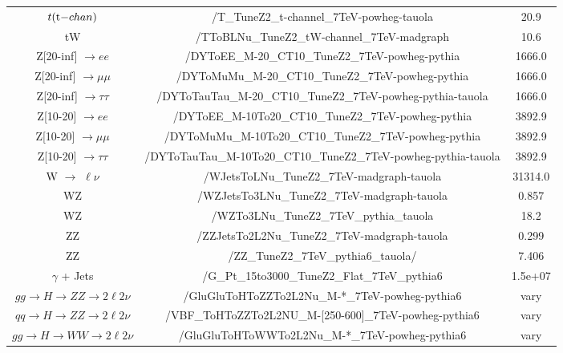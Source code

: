 \begin{table}[!ht]
\begin{center}
{\begin{tabular}{|c|c|c|}
$\singletopt$                  	 	 &   /T\_TuneZ2\_t-channel\_7TeV-powheg-tauola                         &  20.9 \\
tW                                    	 &   /TToBLNu\_TuneZ2\_tW-channel\_7TeV-madgraph                       &  10.6 \\
Z[20-inf] $\rightarrow ee$	  	 &   /DYToEE\_M-20\_CT10\_TuneZ2\_7TeV-powheg-pythia                   &  1666.0 \\
Z[20-inf] $\rightarrow \mu\mu$        	 &   /DYToMuMu\_M-20\_CT10\_TuneZ2\_7TeV-powheg-pythia                 &  1666.0 \\
Z[20-inf] $\rightarrow \tau\tau$  	 &   /DYToTauTau\_M-20\_CT10\_TuneZ2\_7TeV-powheg-pythia-tauola        &  1666.0 \\
Z[10-20]  $\rightarrow ee$	  	 &   /DYToEE\_M-10To20\_CT10\_TuneZ2\_7TeV-powheg-pythia               &  3892.9 \\
Z[10-20]  $\rightarrow \mu\mu$    	 &   /DYToMuMu\_M-10To20\_CT10\_TuneZ2\_7TeV-powheg-pythia             &  3892.9 \\
Z[10-20]  $\rightarrow \tau\tau$  	 &   /DYToTauTau\_M-10To20\_CT10\_TuneZ2\_7TeV-powheg-pythia-tauola    &  3892.9 \\
W $\rightarrow$ $\ell\nu$           	 &   /WJetsToLNu\_TuneZ2\_7TeV-madgraph-tauola                         &  31314.0 \\
WZ                               	 &   /WZJetsTo3LNu\_TuneZ2\_7TeV-madgraph-tauola                       &  0.857 \\
WZ                               	 &   /WZTo3LNu\_TuneZ2\_7TeV\_pythia\_tauola                           & 18.2 \\
ZZ                               	 &   /ZZJetsTo2L2Nu\_TuneZ2\_7TeV-madgraph-tauola                      &  0.299 \\
ZZ                               	 &   /ZZ\_TuneZ2\_7TeV\_pythia6\_tauola/                               & 7.406 \\
$\gamma$ + Jets                          &   /G\_Pt\_15to3000\_TuneZ2\_Flat\_7TeV\_pythia6                     & 1.5e+07    \\
$gg \to H \to ZZ \to 2\ell2\nu$          &   /GluGluToHToZZTo2L2Nu\_M-*\_7TeV-powheg-pythia6                   & vary \\
$qq \to H \to ZZ \to 2\ell2\nu$          &   /VBF\_ToHToZZTo2L2NU\_M-[250-600]\_7TeV-powheg-pythia6            & vary \\
$gg \to H \to WW \to 2\ell2\nu$          &   /GluGluToHToWWTo2L2Nu\_M-*\_7TeV-powheg-pythia6                   & vary \\

\end{tabular}}
\end{center}
\end{table}
